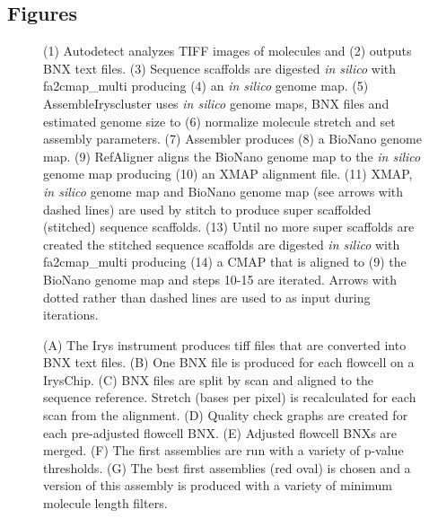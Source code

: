 \documentclass{bmcart}
\begin{document}
\begin{backmatter}
\section*{Figures}
  \begin{figure}[h!]
  	\caption{
  		(1) Autodetect analyzes TIFF images of molecules and (2) outputs BNX text files. (3) Sequence scaffolds are digested \textit{in silico} with fa2cmap\_multi producing (4) an \textit{in silico} genome map. (5) AssembleIryscluster uses \textit{in silico} genome maps, BNX files and estimated genome size to (6) normalize molecule stretch and set assembly parameters. (7) Assembler produces (8) a BioNano genome map. (9) RefAligner aligns the BioNano genome map to the \textit{in silico} genome map producing (10) an XMAP alignment file. (11) XMAP, \textit{in silico} genome map and BioNano genome map (see arrows with dashed lines) are used by stitch to produce super scaffolded (stitched) sequence scaffolds. (13) Until no more super scaffolds are created the stitched sequence scaffolds are digested \textit{in silico} with fa2cmap\_multi producing (14) a CMAP that is aligned to (9) the BioNano genome map and steps 10-15 are iterated. Arrows with dotted rather than dashed lines are used to as input during iterations.}
  \end{figure}
  \begin{figure}[h!]
  	\caption{
  		(A) The Irys instrument produces tiff files that are converted into BNX text files. (B) One BNX file is produced for each flowcell on a IrysChip. (C) BNX files are split by scan and aligned to the sequence reference. Stretch (bases per pixel) is recalculated for each scan from the alignment. (D) Quality check graphs are created for each pre-adjusted flowcell BNX. (E) Adjusted flowcell BNXs are merged. (F) The first assemblies are run with a variety of p-value thresholds. (G) The best first assemblies (red oval) is chosen and a version of this assembly is produced with a variety of minimum molecule length filters.}
  \end{figure}
  \begin{figure}[h!]
  \caption{
}
\end{figure}
\end{backmatter}
\end{document}
